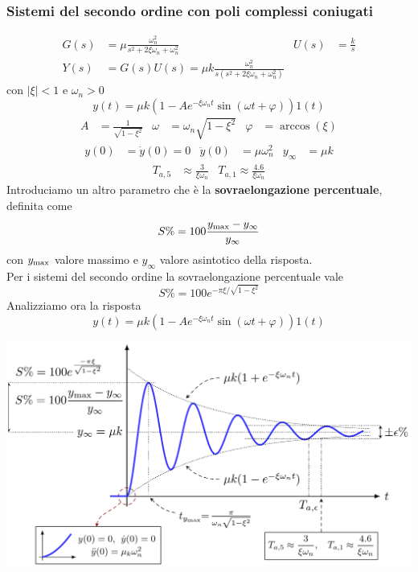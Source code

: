 \documentclass{article}
\numberwithin{equation}{subsection}
\begin{document}
\subsubsection{Sistemi del secondo ordine con poli complessi coniugati}
\begin{align*}
    G(s) &= \mu\frac{\omega^2_n}{s^2+2 \xi \omega_n + \omega^2_n} & U(s) &= \frac{k}{s}
    \\
    Y(s) &= G(s)U(s) = \mu k \frac{\omega^2_n}{s(s^2+2 \xi \omega_n + \omega^2_n)}
\end{align*}
con $|\xi|<1$ e $\omega_n > 0$
\[
    y(t) = \mu k(1 - Ae^{-\xi \omega_n t}\sin(\omega t + \varphi))1(t)
\]
\begin{align*}
    A &= \frac{1}{\sqrt{1-\xi^2}} & \omega &= \omega_n\sqrt{1 - \xi^2} & \varphi &= \arccos(\xi)
\end{align*}
\begin{align*}
    y(0) &= \dot y(0) = 0 & \ddot y(0) &= \mu \omega^2_n & y_{\infty} &= \mu k
\end{align*}
\begin{align*}
    T_{a,5} &\approx \frac{3}{\xi \omega_n} & T_{a,1} \approx \frac{4.6}{\xi \omega_n}
\end{align*}
Introduciamo un altro parametro che è la \textbf{sovraelongazione percentuale}, definita come
\begin{equation}
    S\% = 100 \frac{y_{\text{max}} - y_\infty}{y_{\infty}}
\end{equation}
con $y_{\text{max}}$ valore massimo e $y_{\infty}$ valore asintotico della risposta.
\vspace*{0.1cm}\\
Per i sistemi del secondo ordine la sovraelongazione percentuale vale
\begin{equation}
    S\% = 100 e^{-\pi \xi / \sqrt{1-\xi^2}}
\end{equation}
\vspace*{0.2cm}
Analizziamo ora la risposta
\[
    y(t) = \mu k(1 - Ae^{-\xi \omega_n t}\sin(\omega t + \varphi))1(t)
\]
\begin{center}
    \includegraphics[scale=0.23]{Images/Sovraelongazione.png}
\end{center}
\end{document}
